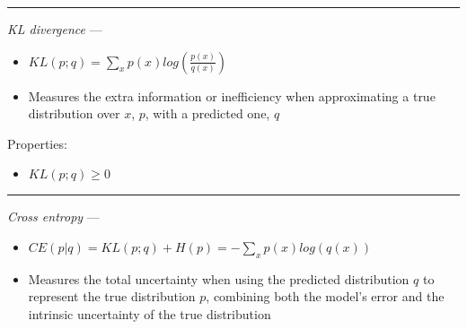 {\color{lightgray}\hrule height 0.001mm}

\emph{KL divergence} --- 
\begin{itemize}
    \item $KL(p;q) = \sum_x p(x) log(\frac{p(x)}{q(x)})$ 
    \item Measures the extra information or inefficiency when approximating a true distribution over $x$, $p$, with a predicted one, $q$
\end{itemize}
Properties:
\begin{itemize}
    \item $KL(p;q) \geq 0$
\end{itemize}

{\color{lightgray}\hrule height 0.001mm}

\emph{Cross entropy} --- 
\begin{itemize}
    \item $CE(p|q) = KL(p;q) + H(p) = -\sum_x p(x)log(q(x))$ 
    \item Measures the total uncertainty when using the predicted distribution $q$ to represent the true distribution $p$, combining both the model's error and the intrinsic uncertainty of the true distribution 
\end{itemize}